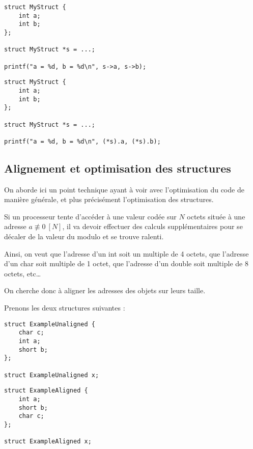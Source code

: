 \documentclass[../../../main.tex]{subfiles}
\begin{document}
\begin{minipage}{0.5\textwidth}
\begin{verbatim}
struct MyStruct {
	int a;
	int b;
};

struct MyStruct *s = ...;

printf("a = %d, b = %d\n", s->a, s->b);
\end{verbatim}
\end{minipage}
\begin{minipage}{0.5\textwidth}
\begin{verbatim}
struct MyStruct {
	int a;
	int b;
};

struct MyStruct *s = ...;

printf("a = %d, b = %d\n", (*s).a, (*s).b);
\end{verbatim}
\end{minipage}
\subsection{Alignement et optimisation des structures}
\label{sub:alignement}
On aborde ici un point technique ayant à voir avec l'optimisation du code de manière générale, et plus précisément l'optimisation des structures.

Si un processeur tente d'accéder à une valeur codée sur $N$ octets située à une adresse $a \not\equiv 0\ [N]$, il va devoir effectuer des calculs supplémentaires pour se décaler de la valeur du modulo et se trouve ralenti.

Ainsi, on veut que l'adresse d'un \textsf{int} soit un multiple de 4 octets, que l'adresse d'un \textsf{char} soit multiple de 1 octet, que l'adresse d'un \textsf{double} soit multiple de 8 octets, etc\dots


On cherche donc à aligner les adresses des objets sur leurs taille.

Prenons les deux structures suivantes :

\begin{minipage}{0.5\textwidth}
\begin{verbatim}
struct ExampleUnaligned {
	char c;
	int a;
	short b;
};

struct ExampleUnaligned x;
\end{verbatim}
\end{minipage}
\begin{minipage}{0.5\textwidth}
\begin{verbatim}
struct ExampleAligned {
	int a;
	short b;
	char c;
};

struct ExampleAligned x;
\end{verbatim}
\end{minipage}
\end{document}
